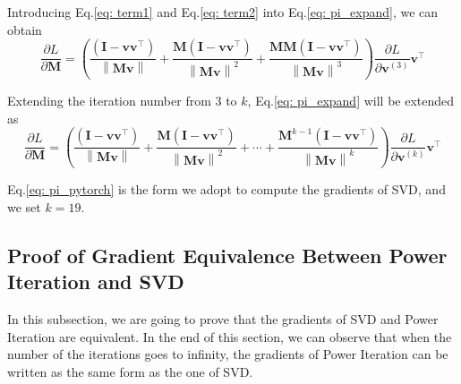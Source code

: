 \documentclass{article}
\newcommand{\bM}{\mathbf{M}}
\newcommand{\bv}{\mathbf{v}}
\newcommand{\bI}{\mathbf{I}}
\begin{document}
Introducing Eq.\ref{eq: term1} and Eq.\ref{eq: term2} into Eq.\ref{eq: pi_expand}, we can obtain	
	\begin{equation}
	\frac{\partial L}{\partial \bM}
	 = \left( \frac{\left(\bI-\bv \bv^{\top}\right)}{\left\|\bM \bv\right\|} +
	 \frac{\bM \left(\bI-\bv \bv^{\top}\right)}{\left\|\bM \bv\right\|^{2}}  + 
	 \frac{\bM \bM \left(\bI-\bv \bv^{\top}\right)}{\left\|\bM \bv\right\|^{3}} \right)
	 \frac{\partial L}{\partial \bv^{(3)}} \bv^{\top}
	\label{eq: pi_3iter}
	\end{equation}

Extending the iteration number from 3 to $k$, Eq.\ref{eq: pi_expand} will be extended as
	\begin{equation}
	\frac{\partial L}{\partial \bM}
	 = \left( \frac{\left(\bI-\bv \bv^{\top}\right)}{\left\|\bM \bv\right\|}  +
	 \frac{\bM \left(\bI-\bv \bv^{\top}\right)}{\left\|\bM \bv\right\|^{2}}  + \cdots +
	 \frac{\bM^{k-1} \left(\bI-\bv \bv^{\top}\right)}{\left\|\bM \bv\right\|^{k}} \right) \frac{\partial L}{\partial \bv^{(k)}}
	\bv^{\top}
	\label{eq: pi_pytorch}
	\end{equation}	

Eq.\ref{eq: pi_pytorch} is the form we adopt to compute the gradients of SVD, and we set $k{=}19$.

\subsection{Proof of Gradient Equivalence Between Power Iteration and SVD}
In this subsection, we are going to prove that the gradients of SVD and Power Iteration are equivalent. In the end of this section, we can observe that when the number of the iterations goes to infinity, the gradients of Power Iteration can be written as the same form as the one of SVD.
\end{document}
